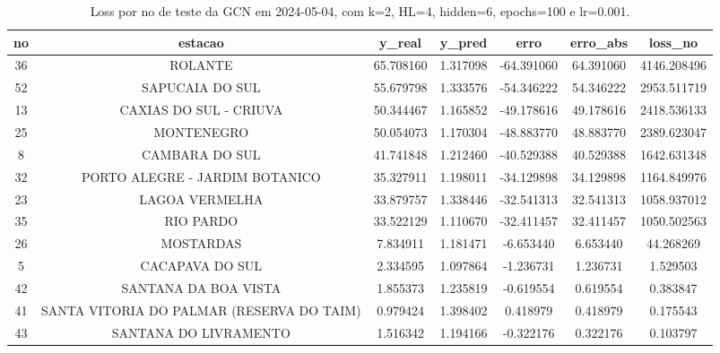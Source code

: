\begin{table}[h]
\centering
\caption{Loss por no de teste da GCN em 2024-05-04, com k=2, HL=4, hidden=6, epochs=100 e lr=0.001.}
\label{tab:gcn_loss_k2_hl4_h6_e100_d20240504}
\begin{tabular}{ccccccc}
\toprule
no & estacao & y\_real & y\_pred & erro & erro\_abs & loss\_no \\
\midrule
36 & ROLANTE & 65.708160 & 1.317098 & -64.391060 & 64.391060 & 4146.208496 \\
52 & SAPUCAIA DO SUL & 55.679798 & 1.333576 & -54.346222 & 54.346222 & 2953.511719 \\
13 & CAXIAS DO SUL - CRIUVA & 50.344467 & 1.165852 & -49.178616 & 49.178616 & 2418.536133 \\
25 & MONTENEGRO & 50.054073 & 1.170304 & -48.883770 & 48.883770 & 2389.623047 \\
8 & CAMBARA DO SUL & 41.741848 & 1.212460 & -40.529388 & 40.529388 & 1642.631348 \\
32 & PORTO ALEGRE - JARDIM BOTANICO & 35.327911 & 1.198011 & -34.129898 & 34.129898 & 1164.849976 \\
23 & LAGOA VERMELHA & 33.879757 & 1.338446 & -32.541313 & 32.541313 & 1058.937012 \\
35 & RIO PARDO & 33.522129 & 1.110670 & -32.411457 & 32.411457 & 1050.502563 \\
26 & MOSTARDAS & 7.834911 & 1.181471 & -6.653440 & 6.653440 & 44.268269 \\
5 & CACAPAVA DO SUL & 2.334595 & 1.097864 & -1.236731 & 1.236731 & 1.529503 \\
42 & SANTANA DA BOA VISTA & 1.855373 & 1.235819 & -0.619554 & 0.619554 & 0.383847 \\
41 & SANTA VITORIA DO PALMAR (RESERVA DO TAIM) & 0.979424 & 1.398402 & 0.418979 & 0.418979 & 0.175543 \\
43 & SANTANA DO LIVRAMENTO & 1.516342 & 1.194166 & -0.322176 & 0.322176 & 0.103797 \\
\bottomrule
\end{tabular}
\end{table}

